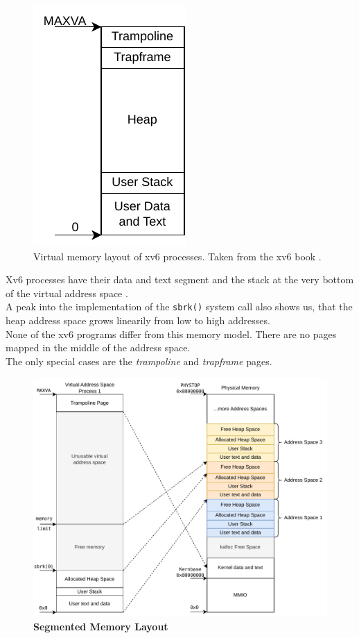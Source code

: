 \begin{figure}[t!]
    \centering
    \includegraphics[scale=.5]{figures/prog_vm.pdf}
    \caption[xv6 memory layout]{Virtual memory layout of xv6 processes. Taken from the xv6 book \cite{cox2011xv6}.}
    \label{impl:proclayout}
\end{figure}

Xv6 processes have their data and text segment and the stack at the very bottom of the virtual
address space \cite{cox2011xv6}.\\
A peak into the implementation of the \texttt{sbrk()} system call also shows us, that the heap
address space grows linearily from low to high addresses.\\
None of the xv6 programs differ from this memory model. There are no pages mapped in the
middle of the address space.\\
The only special cases are the \textit{trampoline} and \textit{trapframe} pages.


\begin{figure}[ht!]
    \centering
    \includegraphics[]{figures/segmented_layout.pdf}
    \caption[Segmented Memory Layout]{\textbf{Segmented Memory Layout}}
    \label{fig:theory:segLayout}
\end{figure}


